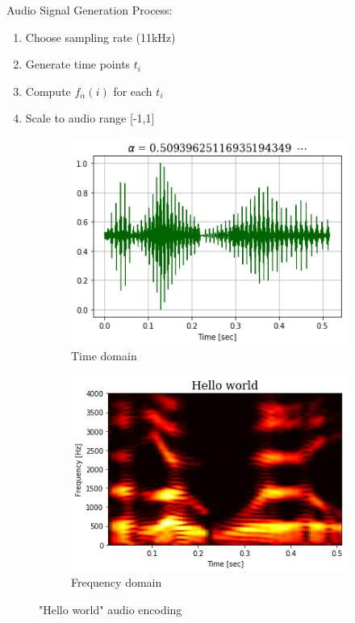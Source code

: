 \documentclass[10pt]{beamer}
\begin{document}
\begin{frame}{Audio Signal Generation}
Process:
\begin{enumerate}
\item Choose sampling rate (11kHz)
\item Generate time points $t_i$
\item Compute $f_\alpha(i)$ for each $t_i$
\item Scale to audio range [-1,1]
\end{enumerate}

\begin{figure}
\begin{subfigure}{0.48\textwidth}
\includegraphics[width=\textwidth]{fig/note01/generated_waveform.png}
\caption{Time domain}
\end{subfigure}
\begin{subfigure}{0.48\textwidth}
\includegraphics[width=\textwidth]{fig/note01/generated_spectrogram.png}
\caption{Frequency domain}
\end{subfigure}
\caption{"Hello world" audio encoding}
\end{figure}
\end{frame}
\end{document}
